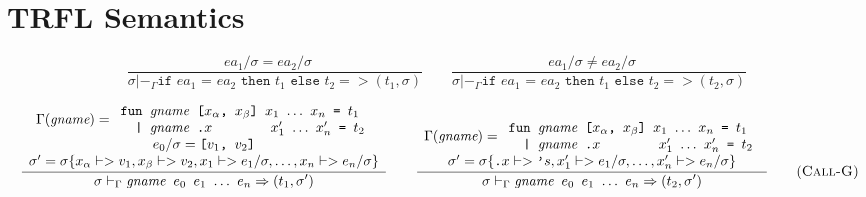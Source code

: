 \documentclass[10pt]{../sigplanconf}
\newcommand{\nfrac}[2]{\frac{\displaystyle{#1}}{\displaystyle{#2}}}
\newcommand{\tagsc}[1]{\tag{\scshape #1}}
\begin{document}



\appendix
\section{TRFL Semantics}
\begin{figure}\centering
  \begin{equation}
    \nfrac{
      ea_1/ \sigma = ea_2/\sigma \quad
    }{
      \sigma |-_\Gamma \texttt{if $ea_1$ = $ea_2$ then $t_1$ else $t_2$} => (t_1, \sigma)
    }
    \qquad
    \nfrac{
      ea_1/ \sigma \neq ea_2/\sigma \quad
    }{
      \sigma |-_\Gamma \texttt{if $ea_1$ = $ea_2$ then $t_1$ else $t_2$} => (t_2, \sigma)
    } \tagsc{If}
\end{equation}

\begin{equation}
\hspace{-0.7cm}
  \nfrac{
    \begin{array}{c}
      \Gamma(\textit{gname}) =
      \begin{array}{l}
        \texttt{fun \textit{\rmfamily gname} [$x_\alpha$, $x_\beta$] $x_1$ $\ldots$ $x_n$ = $t_1$} \\
        \texttt{\ \ | \textit{\rmfamily gname}\ \texttt{.}$x$ \hspace{1.1cm} $x_1'$ $\ldots$ $x_n'$ = $t_2$} \\
      \end{array} \\
      e_0/\sigma = \texttt{[$v_1$, $v_2$]} \\
      \sigma' = \sigma\{x_\alpha |-> v_1, x_\beta |-> v_2, x_1 |-> e_1/\sigma, \ldots, x_n |-> e_n/\sigma\} 
    \end{array}
  }{
    \sigma |-_\Gamma \texttt{\textit{\rmfamily gname} $e_0$ $e_1$ $\ldots$ $e_n$} => (t_1, \sigma')
  }
\qquad
  \nfrac{
    \begin{array}{c}
      \Gamma(\textit{gname}) =
      \begin{array}{l}
        \texttt{fun \textit{\rmfamily gname} [$x_\alpha$, $x_\beta$] $x_1$ $\ldots$ $x_n$ = $t_1$} \\
        \texttt{\ \ | \textit{\rmfamily gname}\ \texttt{.}$x$ \hspace{1.1cm} $x_1'$ $\ldots$ $x_n'$ = $t_2$} \\
      \end{array} \\
      \sigma' = \sigma\{\texttt{.}x |-> \texttt{'}s, x_1' |-> e_1/\sigma, \ldots, x_n' |-> e_n/\sigma\}
    \end{array}
  }{
    \sigma |-_\Gamma \texttt{\textit{\rmfamily gname} $e_0$ $e_1$ $\ldots$ $e_n$} => (t_2, \sigma')
  }
  \tagsc{Call-G}
\end{equation}


\end{figure}
\end{document}
